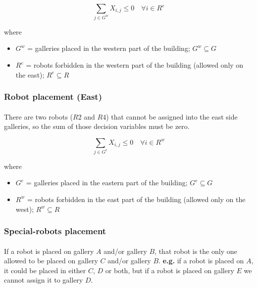 \begin{equation}
    \sum_{j \in G^w}X_{i,j} \leq 0 \quad \forall i \in R^e
\end{equation}

where

\begin{itemize}
    \item[] $G^w$ = galleries placed in the western part of the building; $G^w \subseteq G$
    \item[] $R^e$ = robots forbidden in the western part of the building (allowed only on the east); $R^e \subseteq R$
\end{itemize}

\subsubsection{Robot placement (East)}

\paragraph{}
There are two robots ($R2$ and $R4$) that cannot be assigned into the east side galleries, so the sum of those decision variables must be zero.

\begin{equation}
    \sum_{j \in G^e}X_{i,j} \leq 0 \quad \forall i \in R^w
\end{equation}

where

\begin{itemize}
    \item[] $G^e$ = galleries placed in the eastern part of the building; $G^e \subseteq G$
    \item[] $R^w$ = robots forbidden in the east part of the building (allowed only on the west); $R^w \subseteq R$
\end{itemize}




\subsubsection{Special-robots placement}

\paragraph{}
If a robot is placed on gallery $A$ and/or gallery $B$, that robot is the only one allowed to be placed on gallery $C$ and/or gallery $B$. \textbf{e.g.} if a robot is placed on $A$, it could be placed in either $C$, $D$ or both, but if a robot is placed on gallery $E$ we cannot assign it to gallery $D$.

